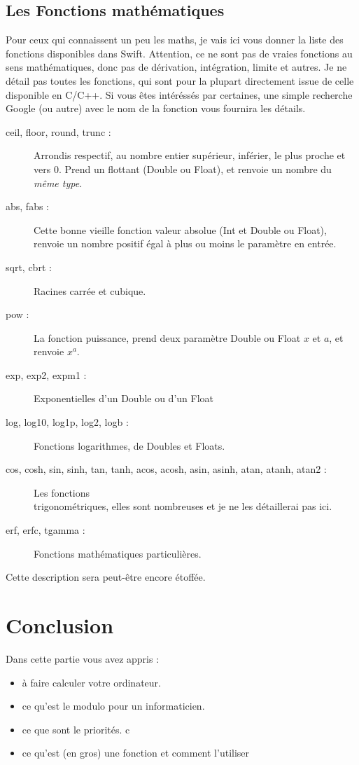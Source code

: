 \subsection{Les Fonctions mathématiques}

Pour ceux qui connaissent un peu les maths, je vais ici vous donner la liste des fonctions disponibles dans Swift. Attention, ce ne sont pas de vraies fonctions au sens mathématiques, donc pas de dérivation, intégration, limite et autres.
Je ne détail pas toutes les fonctions, qui sont pour la plupart directement issue de celle disponible en C/C++.
Si vous êtes intéréssés par certaines, une simple recherche Google (ou autre) avec le nom de la fonction vous fournira les détails.
\begin{description}
\item[ceil, floor, round, trunc :]
Arrondis respectif, au nombre entier supérieur, inférier, le plus proche et vers 0. Prend un flottant (Double ou Float), et renvoie un nombre du \emph{même type}.
\item[abs, fabs :]
Cette bonne vieille fonction valeur absolue (Int et Double ou Float), renvoie un nombre positif égal à plus ou moins le paramètre en entrée.
\item[sqrt, cbrt :]
Racines carrée et cubique.
\item[pow :]
La fonction puissance, prend deux paramètre Double ou Float $x$ et $a$, et renvoie $x^{a}$. %
\item[exp, exp2, expm1 :]
Exponentielles d'un Double ou d'un Float
\item[log, log10, log1p, log2, logb :]
Fonctions logarithmes, de Doubles et Floats.
\item[cos, cosh, sin, sinh, tan, tanh, acos, acosh, asin, asinh, atan, atanh, atan2 :]
Les fonctions\\
trigonométriques, elles sont nombreuses et je ne les détaillerai pas ici.
\item[erf, erfc, tgamma :]
Fonctions mathématiques particulières.
\end{description}
Cette description sera peut-être encore étoffée.
\section*{Conclusion}
{}
Dans cette partie vous avez appris :
\begin{itemize}
\item à faire calculer votre ordinateur.
\item ce qu'est le modulo pour un informaticien.
\item ce que sont le priorités.
c\item ce qu'est (en gros) une fonction et comment l'utiliser
\end{itemize}
